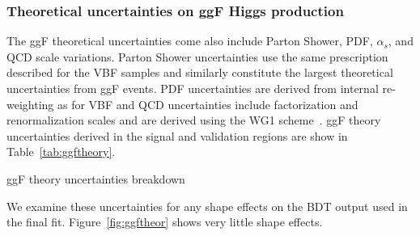 \subsubsection{Theoretical uncertainties on ggF Higgs production}
The ggF theoretical uncertainties come also include Parton Shower, PDF, $\alpha_s$, and QCD scale variations. Parton Shower uncertainties use the same prescription described for the VBF samples and similarly constitute the largest theoretical uncertainties from ggF events. PDF uncertainties are derived from internal re-weighting as for VBF and QCD uncertainties include factorization and renormalization scales and are derived using the WG1 scheme~\cite{WG1}. ggF theory uncertainties derived in the signal and validation regions are show in Table~\ref{tab:ggftheory}.
\begin{table}[h!]
\centering
\scalebox{1.0}{

}
\caption{ggF theory uncertainties breakdown}
\label{tab:ggftheory}
\end{table}

We examine these uncertainties for any shape effects on the BDT output used in the final fit. Figure~\ref{fig:ggftheor} shows very little shape effects. 

